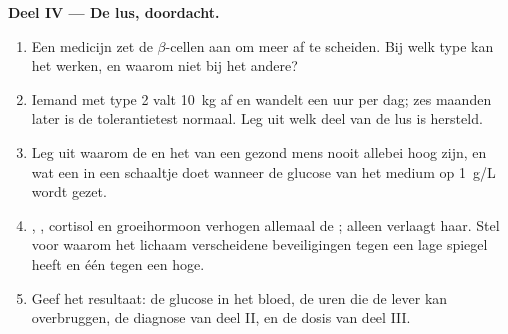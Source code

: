 \begin{problem}
\medskip
\noindent\textbf{Deel IV --- De lus, doordacht.}
\begin{enumerate}[resume]
  \item Een medicijn zet de $\beta$-cellen aan om meer  af te
        scheiden. Bij welk type  kan het werken, en waarom niet
        bij het andere?
  \item Iemand met type 2 valt \qty{10}{kg} af en wandelt een uur per
        dag; zes maanden later is de tolerantietest normaal. Leg uit welk
        deel van de lus is hersteld.
  \item Leg uit waarom de  en het  van een gezond mens
        nooit allebei hoog zijn, en wat een  in een schaaltje doet
        wanneer de glucose van het medium op \qty{1}{g/L} wordt gezet.
  \item {}, , cortisol en groeihormoon verhogen allemaal
        de ; alleen  verlaagt haar. Stel voor waarom
        het lichaam verscheidene beveiligingen tegen een lage spiegel
        heeft en één tegen een hoge.
  \item Geef het resultaat: de glucose in het bloed, de uren die de lever
        kan overbruggen, de diagnose van deel II, en de dosis van deel
        III.
\end{enumerate}
\end{problem}
